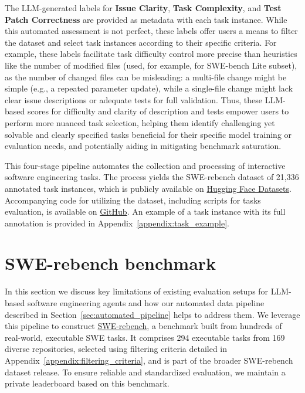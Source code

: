 \documentclass[dandb]{article}
\begin{document}
The LLM-generated labels for \textbf{Issue Clarity}, \textbf{Task Complexity}, and \textbf{Test Patch Correctness} are provided as metadata with each task instance. While this automated assessment is not perfect, these labels offer users a means to filter the dataset and select task instances according to their specific criteria. For example, these labels facilitate task difficulty control more precise than heuristics like the number of modified files (used, for example, for SWE-bench Lite subset), as the number of changed files can be misleading: a multi-file change might be simple (e.g., a repeated parameter update), while a single-file change might lack clear issue descriptions or adequate tests for full validation. Thus, these LLM-based scores for difficulty and clarity of description and tests empower users to perform more nuanced task selection, helping them identify challenging yet solvable and clearly specified tasks beneficial for their specific model training or evaluation needs, and potentially aiding in mitigating benchmark saturation.

This four-stage pipeline automates the collection and processing of interactive software engineering tasks. The process yields the SWE-rebench dataset of 21,336 annotated task instances, which is publicly available on \href{https://huggingface.co/datasets/nebius/SWE-rebench}{Hugging Face Datasets}. Accompanying code for utilizing the dataset, including scripts for tasks evaluation, is available on \href{https://github.com/SWE-rebench/SWE-bench-fork}{GitHub}. An example of a task instance with its full annotation is provided in Appendix~\ref{appendix:task_example}. 

\section{SWE-rebench benchmark}
\label{sec:swe_rebench_benchmark}

In this section we discuss key limitations of existing evaluation setups for LLM-based software engineering agents and how our automated data pipeline described in Section~\ref{sec:automated_pipeline} helps to address them. We leverage this pipeline to construct \href{http://swe-rebench.com}{SWE-rebench}, a benchmark built from hundreds of real-world, executable SWE tasks.
It comprises 294 executable tasks from 169 diverse repositories, selected using filtering criteria detailed in Appendix~\ref{appendix:filtering_criteria}, and is part of the broader SWE-rebench dataset release. To ensure reliable and standardized evaluation, we maintain a private leaderboard based on this benchmark.
\end{document}
